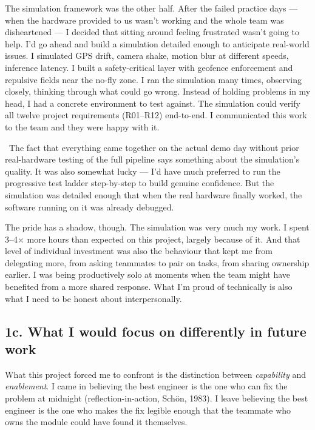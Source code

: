 The simulation framework was the other half. After the failed practice days --- when the hardware provided to us wasn't working and the whole team was disheartened --- I decided that sitting around feeling frustrated wasn't going to help. I'd go ahead and build a simulation detailed enough to anticipate real-world issues. I simulated GPS drift, camera shake, motion blur at different speeds, inference latency. I built a safety-critical layer with geofence enforcement and repulsive fields near the no-fly zone. I ran the simulation many times, observing closely, thinking through what could go wrong. Instead of holding problems in my head, I had a concrete environment to test against. The simulation could verify all twelve project requirements (R01--R12) end-to-end. I communicated this work to the team and they were happy with it.

\www\ The fact that everything came together on the actual demo day without prior real-hardware testing of the full pipeline says something about the simulation's quality. It was also somewhat lucky --- I'd have much preferred to run the progressive test ladder step-by-step to build genuine confidence. But the simulation was detailed enough that when the real hardware finally worked, the software running on it was already debugged.

The pride has a shadow, though. The simulation was very much my work. I spent 3--4$\times$ more hours than expected on this project, largely because of it. And that level of individual investment was also the behaviour that kept me from delegating more, from asking teammates to pair on tasks, from sharing ownership earlier. I was being productively solo at moments when the team might have benefited from a more shared response. What I'm proud of technically is also what I need to be honest about interpersonally.


\subsection{1c. What I would focus on differently in future work}

What this project forced me to confront is the distinction between \textit{capability} and \textit{enablement}. I came in believing the best engineer is the one who can fix the problem at midnight (reflection-in-action, Sch\"on, 1983). I leave believing the best engineer is the one who makes the fix legible enough that the teammate who owns the module could have found it themselves.

